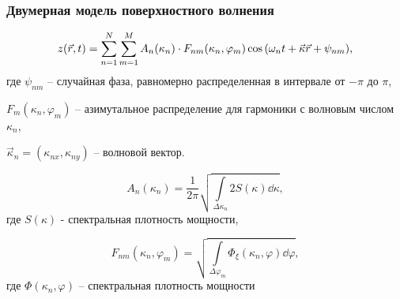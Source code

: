 \documentclass[10pt,pdf,hyperref={unicode}, dvipsnames]{beamer}
\renewcommand{\phi}{\varphi}
\begin{document}
\begin{frame}[t]

\frametitle{Двумерная модель поверхностного волнения}


\begin{equation}
    \label{eq:surface2d}
    z(\vec r,t) = \sum\limits_{n=1}^{N} \sum\limits_{m=1}^{M}
    A_n(\kappa_n) \cdot
    F_{nm}(\kappa_n,\phi_m) \cos \qty(\omega_n t + \vec \kappa \vec r + \psi_{nm}),
\end{equation}
где $\psi_{nm}$ -- случайная фаза, равномерно распределенная в интервале от
$-\pi$
до $ \pi$, 

$F_m(\kappa_n, \phi_m)$ -- азимутальное
распределение для гармоники с волновым числом  $\kappa_n$,  

$\vec \kappa_n =
(\kappa_{nx}, \kappa_{ny})$ -- 
волновой вектор. 

\begin{equation}
    \label{eq:Amplitude}
    A_n(\kappa_n) = \frac{1}{2 \pi} \sqrt{\int\limits_{\Delta \kappa_n} 2
        S(\kappa)
    \dd \kappa},
\end{equation}
 где  $S(\kappa)$  - спектральная плотность
мощности,

\begin{equation}
    F_{nm}(\kappa_n,\phi_m) = \sqrt{\int\limits_{\Delta \phi_m}
    \Phi_{\xi}(\kappa_n,\phi) \dd \phi},
    \end{equation}
 где  $\Phi(\kappa_n, \phi)$   -- { спектральная плотность
    мощности}

\end{frame}
\end{document}
